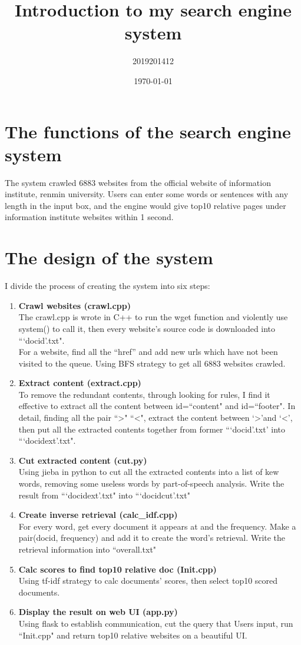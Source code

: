 \documentclass{article}
\title{\textbf{Introduction to my search engine system}}
\author{2019201412\quad信息学院\quad向尔格}
\date{\today}
\begin{document}
\maketitle
\section{The functions of the search engine system}
The system crawled 6883 websites from the official website of information institute, renmin university. Users can enter some words or sentences with any length in the input box, and the engine would give top10 relative pages under information institute websites within 1 second.
\section{The design of the system}
I divide the process of creating the system into six steps: 
\begin{enumerate} %
\item \textbf{Crawl websites (crawl.cpp)} \\
The crawl.cpp is wrote in C++ to run the wget function and violently use system() to call it, then every website's source code is downloaded into ```docid'.txt". \\
For a website, find all the “href” and add new urls which have not been visited to the queue. Using BFS strategy to get all 6883 websites crawled.
\item \textbf{Extract content (extract.cpp)} \\
To remove the redundant contents, through looking for rules, I find it effective to extract all the content between id=``content" and id=``footer". In detail, finding all the pair ``\textgreater" ``\textless", extract the content between `\textgreater'and `\textless', then put all the extracted contents together from former ```docid'.txt' into ```docidext'.txt".
\item \textbf{Cut extracted content (cut.py)} \\
Using jieba in python to cut all the extracted contents into a list of kew words, removing some useless words by part-of-speech analysis. Write the result from ```docidext'.txt" into ```docidcut'.txt"
\item \textbf{Create inverse retrieval (calc\_idf.cpp)} \\
For every word, get every document it appears at and the frequency. Make a pair(docid, frequency) and add it to create the word's retrieval. Write the retrieval information into ``overall.txt"
\item \textbf{Calc scores to find top10 relative doc (Init.cpp)} \\
Using tf-idf strategy to calc documents' scores, then select top10 scored documents.
\item \textbf{Display the result on web UI (app.py)} \\
Using flask to establish communication, cut the query that Users input, run ``Init.cpp" and return top10 relative websites on a beautiful UI.
\end{enumerate}
\end{document}
